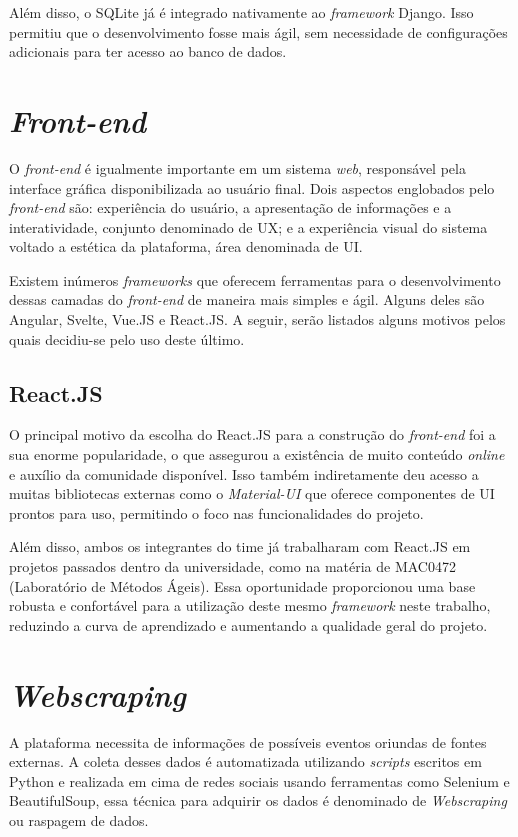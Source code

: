 Além disso, o SQLite já é integrado nativamente ao \textit{framework} Django.
Isso permitiu que o desenvolvimento fosse mais ágil, sem necessidade de
configurações adicionais para ter acesso ao banco de dados.

\section{\textit{Front-end}}

O \textit{front-end} é igualmente importante em um sistema \textit{web},
responsável pela interface gráfica disponibilizada ao usuário final. Dois
aspectos englobados pelo \textit{front-end} são: experiência do usuário, a
apresentação de informações e a interatividade, conjunto denominado de \ac{UX};
e a experiência visual do sistema voltado a estética da plataforma, área
denominada de \ac{UI}.

Existem inúmeros \textit{frameworks} que oferecem ferramentas para o
desenvolvimento dessas camadas do \textit{front-end} de maneira mais simples e
ágil. Alguns deles são Angular, Svelte, Vue.JS e React.JS. A seguir, serão
listados alguns motivos pelos quais decidiu-se pelo uso deste último.

\subsection{React.JS}

O principal motivo da escolha do React.JS para a construção do
\textit{front-end} foi a sua enorme popularidade, o que assegurou a existência
de muito conteúdo \textit{online} e auxílio da comunidade disponível. Isso
também indiretamente deu acesso a muitas bibliotecas externas como o
\textit{Material-UI} que oferece componentes de \acs{UI} prontos para uso,
permitindo o foco nas funcionalidades do projeto.

Além disso, ambos os integrantes do time já trabalharam com React.JS em
projetos passados dentro da universidade, como na matéria de MAC0472
(Laboratório de Métodos Ágeis). Essa oportunidade proporcionou uma base robusta
e confortável para a utilização deste mesmo \textit{framework} neste trabalho,
reduzindo a curva de aprendizado e aumentando a qualidade geral do projeto.

\section{\textit{Webscraping}}

A plataforma necessita de informações de possíveis eventos oriundas de fontes
externas. A coleta desses dados é automatizada utilizando \textit{scripts}
escritos em Python e realizada em cima de redes sociais usando ferramentas como
Selenium e BeautifulSoup, essa técnica para adquirir os dados é denominado de
\textit{Webscraping} ou raspagem de dados.

